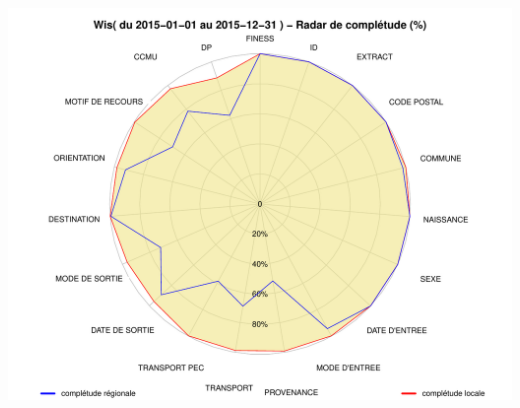 \documentclass[]{article}
\begin{document}
\includegraphics{completude_files/figure-latex/finess-9.pdf}
\end{document}
